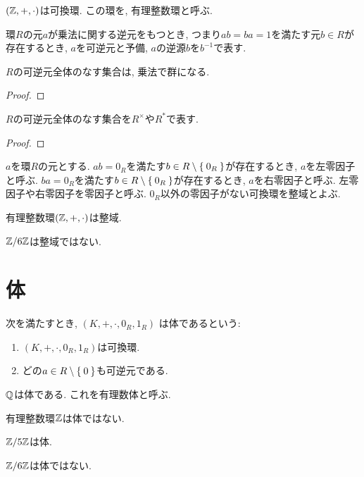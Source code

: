 \begin{example}
  $(\mathbb{Z},+,\cdot)$は可換環.
  この環を, 有理整数環と呼ぶ.
\end{example}

\begin{definition}
  環$R$の元$a$が乗法に関する逆元をもつとき,
  つまり$ab=ba=1$を満たす元$b\in R$が存在するとき,
  $a$を可逆元と予備,
  $a$の逆源$b$を$b^{-1}$で表す.
\end{definition}
\begin{proposition}
  $R$の可逆元全体のなす集合は, 乗法で群になる.
\end{proposition}
\begin{proof}\end{proof}

\begin{definition}
  $R$の可逆元全体のなす集合を$R^\times$や$R^\ast$で表す.
\end{definition}
\begin{proof}\end{proof}

\begin{definition}
  $a$を環$R$の元とする.
  $ab=0_R$を満たす$b\in R\setminus\Set{0_R}$が存在するとき,
  $a$を左零因子と呼ぶ.
  $ba=0_R$を満たす$b\in R\setminus\Set{0_R}$が存在するとき,
  $a$を右零因子と呼ぶ.
  左零因子や右零因子を零因子と呼ぶ.
  $0_R$以外の零因子がない可換環を整域とよぶ.
\end{definition}
  

\begin{example}
  有理整数環$(\mathbb{Z},+,\cdot)$は整域.
\end{example}

\begin{nonexample}
  $\mathbb{Z}/6\mathbb{Z}$は整域ではない.
\end{nonexample}

\section{体}
\begin{definition}
  次を満たすとき,
  $(K,+,\cdot,0_R, 1_R)$
  は体であるという:
  \begin{enumerate}
  \item $(K,+,\cdot,0_R, 1_R)$は可換環.
  \item どの$a\in R\setminus\Set{0}$も可逆元である.
  \end{enumerate}
\end{definition}
\begin{example}
  $\mathbb{Q}$は体である.
  これを有理数体と呼ぶ.
\end{example}
\begin{nonexample}
  有理整数環$\mathbb{Z}$は体ではない.
\end{nonexample}
\begin{example}
  $\mathbb{Z}/5\mathbb{Z}$は体.
\end{example}
\begin{nonexample}
  $\mathbb{Z}/6\mathbb{Z}$は体ではない.
\end{nonexample}


